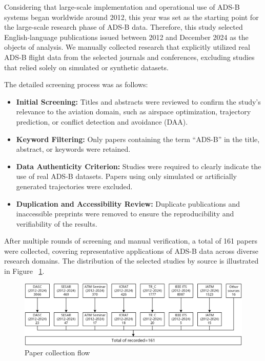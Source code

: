 Considering that large-scale implementation and operational use of ADS-B systems began worldwide around 2012, this year was set as the starting point for the large-scale research phase of ADS-B data. Therefore, this study selected English-language publications issued between 2012 and December 2024 as the objects of analysis. We manually collected research that explicitly utilized real ADS-B flight data from the selected journals and conferences, excluding studies that relied solely on simulated or synthetic datasets.

The detailed screening process was as follows:

\begin{itemize}
    \item \textbf{Initial Screening:} Titles and abstracts were reviewed to confirm the study’s relevance to the aviation domain, such as airspace optimization, trajectory prediction, or conflict detection and avoidance (DAA).
    \item \textbf{Keyword Filtering:} Only papers containing the term ``ADS-B'' in the title, abstract, or keywords were retained.
    \item \textbf{Data Authenticity Criterion:} Studies were required to clearly indicate the use of real ADS-B datasets. Papers using only simulated or artificially generated trajectories were excluded.
    \item \textbf{Duplication and Accessibility Review:} Duplicate publications and inaccessible preprints were removed to ensure the reproducibility and verifiability of the results.
\end{itemize}

After multiple rounds of screening and manual verification, a total of 161 papers were collected, covering representative applications of ADS-B data across diverse research domains. The distribution of the selected studies by source is illustrated in Figure ~\ref{fig:placeholder}.

\begin{figure}
    \centering
    \includegraphics[width=1\linewidth]{paper_selection.png}
    \caption{Paper collection flow}
    \label{fig:placeholder}
\end{figure}
